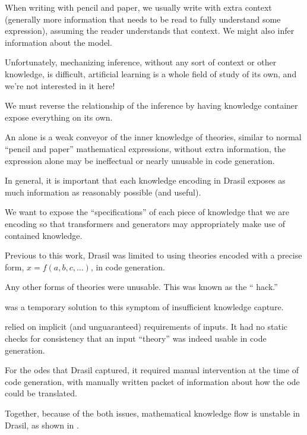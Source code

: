 When writing with pencil and paper, we usually write with extra context
(generally more information that needs to be read to fully understand some
expression), assuming the reader understands that context. We might also infer
information about the model.

Unfortunately, mechanizing inference, without any sort of context or other
knowledge, is difficult, artificial learning is a whole field of study of its
own, and we're not interested in it here!

We must reverse the relationship of the inference by having knowledge container
expose everything on its own.




An \Expr{} alone is a weak conveyor of the inner knowledge of theories, similar
to normal ``pencil and paper'' mathematical expressions, without extra
information, the expression alone may be ineffectual or nearly unusable in code
generation.




In general, it is important that each knowledge encoding in Drasil exposes as
much information as reasonably possible (and useful).

We want to expose the ``specifications'' of each piece of knowledge that we are
encoding so that transformers and generators may appropriately make use of
contained knowledge.

Previous to this work, Drasil was limited to using theories encoded with a
precise form, \(x = f(a, b, c, \ldots{})\), in code generation.

Any other forms of theories were unusable. This was known as the ``\relToQD{}
hack.''




\originalRelToQDHaskell{}

 was a temporary solution to this symptom of
insufficient knowledge capture.

\relToQD{} relied on implicit (and unguaranteed) requirements of inputs. It had
no static checks for consistency that an input ``theory'' was indeed usable in
code generation.




For the \acsp{ode} that Drasil captured, it required manual intervention at the
time of code generation, with manually written packet of information about how
the \acs{ode} could be translated.




Together, because of the both issues, mathematical knowledge flow is unstable in
Drasil, as shown in .


